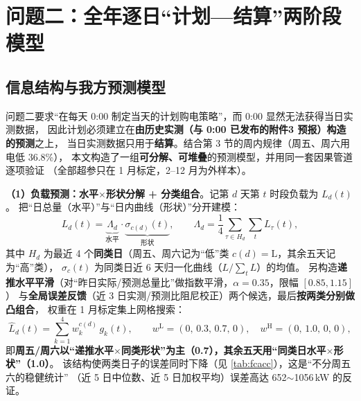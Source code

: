 \section{问题二\nobreak：全年逐日“计划—结算\nobreak”两阶段模型}
\label{sec:q2}

\subsection{信息结构与我方预测模型}

问题二要求“在每天 0:00 制定当天的计划购电策略\nobreak”\nobreak，而 0:00 显然无法获得当日实测数据\nobreak，
因此计划必须建立在\textbf{由历史实测（与 0:00 已发布的附件3 预报\nobreak）构造的预测}之上\nobreak，
当日实测数据只用于\textbf{结算}\nobreak。结合第 3 节的周内规律（周五\nobreak、周六用电低 36.8\%\nobreak）\nobreak，
本文构造了一组\textbf{可分解\nobreak、可堆叠}的预测模型\nobreak，并用同一套因果管道逐项验证
（全部超参只在 1 月标定\nobreak，2--12 月为外样本\nobreak）\nobreak。

\textbf{（1\nobreak）负载预测\nobreak：水平$\times$形状分解 + 分类组合}\nobreak。记第 $d$ 天第 $t$ 时段负载为 $L_d(t)$\nobreak。
把“日总量（水平\nobreak）\nobreak”与“日内曲线（形状\nobreak）\nobreak”分开建模\nobreak：
\begin{equation}
L_d(t)=\underbrace{\Lambda_d}_{\text{水平}}\cdot\underbrace{\sigma_{c(d)}(t)}_{\text{形状}},\qquad
\Lambda_d=\frac{1}{4}\sum_{\tau\in H_d}\sum_{t}L_\tau(t),
\label{eq:basisL}
\end{equation}
其中 $H_d$ 为最近 4 个\textbf{同类日}（周五\nobreak、周六记为“低\nobreak”类 $c(d)=\text{L}$\nobreak，其余五天记为“高\nobreak”类\nobreak）\nobreak，
$\sigma_{c}(t)$ 为同类日近 6 天归一化曲线（$L/\sum_tL$\nobreak）的均值\nobreak。
另构造\textbf{递推水平平滑}（对“昨日实际/预测总量比\nobreak”做指数平滑\nobreak，$\alpha=0.35$\nobreak，限幅 $[0.85,1.15]$\nobreak）
与\textbf{全局误差反馈}（近 3 日实测/预测比阻尼校正\nobreak）两个候选\nobreak，最后\textbf{按两类分别做凸组合}\nobreak，
权重在 1 月标定集上网格搜索\nobreak：
\begin{equation}
\hat L_d(t)=\sum_{k=1}^{4}w^{c(d)}_k\,g_k(t),\qquad
w^{\text{L}}=(0,\,0.3,\,0.7,\,0),\quad w^{\text{H}}=(0,\,1.0,\,0,\,0),
\label{eq:loadweights}
\end{equation}
即\textbf{周五/周六以“递推水平$\times$同类形状\nobreak”为主（0.7\nobreak）\nobreak，其余五天用“同类日水平$\times$形状\nobreak”（1.0\nobreak）}\nobreak。
该结构使两类日子的误差同时下降（见 \cref{tab:fcacc}\nobreak）\nobreak，这是“不分周五六的稳健统计\nobreak”
（近 5 日中位数\nobreak、近 5 日加权平均\nobreak）误差高达 652$\sim$1056\,kW 的反证\nobreak。

